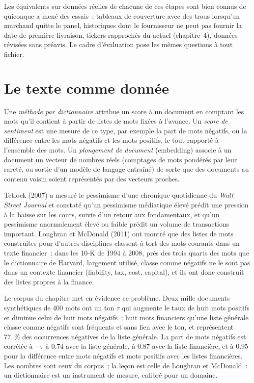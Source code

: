 Les équivalents sur données réelles de chacune de ces étapes sont bien connus de quiconque a mené des essais~: tableaux de couverture avec des trous lorsqu'un marchand quitte le
panel, historiques dont le fournisseur ne peut pas fournir la date de première livraison, tickers rapprochés du  actuel (chapitre~4), données révisées
sans préavis. Le cadre d'évaluation pose les mêmes questions à tout fichier.

\section{Le texte comme donnée}

\begin{definition}\label{def:rs:alternative-and-text-data:text}
Une \emph{méthode par dictionnaire} attribue un score à un document en comptant les mots qu'il contient à partir de listes de mots fixées à l'avance. Un
\emph{score de sentiment} est une mesure de ce type, par exemple la part de mots négatifs, ou la différence entre les mots négatifs
et les mots positifs, le tout rapporté à l'ensemble des mots. Un \emph{plongement de document} (embedding) associe à un document un vecteur de nombres réels (comptages
de mots pondérés par leur rareté, ou sortie d'un modèle de langage entraîné) de sorte que des documents au contenu voisin soient représentés par des vecteurs proches.
\end{definition}

Tetlock (2007) a mesuré le pessimisme d'une chronique quotidienne du \emph{Wall Street Journal} et constaté qu'un pessimisme médiatique élevé prédit une pression à la baisse sur les cours, suivie d'un retour aux fondamentaux, et
qu'un pessimisme anormalement élevé ou faible prédit un volume de transactions important.
Loughran et McDonald (2011) ont montré que des listes de mots construites pour d'autres disciplines classent à tort des mots courants dans un texte financier~: dans les 10-K
de 1994 à 2008, près des trois quarts des mots que le dictionnaire de Harvard, largement utilisé, classe comme négatifs ne le sont pas dans un
contexte financier (liability, tax, cost, capital), et ils ont donc construit des listes propres à la finance.

Le corpus du chapitre met en évidence ce problème. Deux mille documents synthétiques de 400 mots ont un ton $\tau$ qui augmente le taux de huit
mots positifs et diminue celui de huit mots négatifs~; huit mots financiers qu'une liste générale classe comme négatifs sont fréquents et sans lien avec
le ton, et représentent 77~\% des occurrences négatives de la liste générale. La part de mots négatifs est corrélée à $-\tau$ à 0.74 avec la liste générale, à
0.87 avec la liste financière, et à 0.95 pour la différence entre mots négatifs et mots positifs avec les listes financières. Les nombres sont ceux du corpus~; la leçon est celle de Loughran
et McDonald~: un dictionnaire est un instrument de mesure, calibré pour un domaine.

